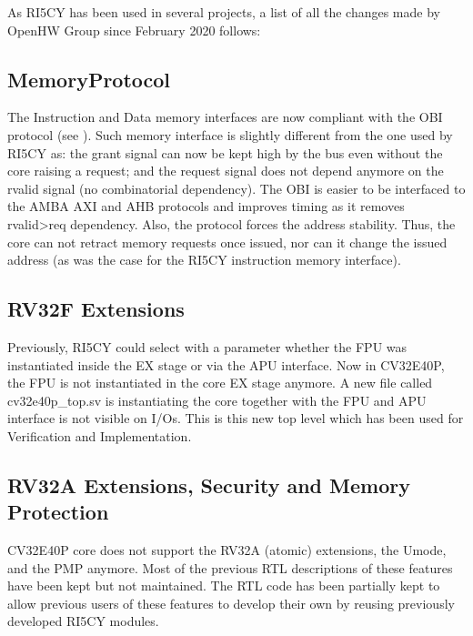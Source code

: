 \documentclass[letterpaper,10pt,english]{sphinxmanual}
\begin{document}
\sphinxAtStartPar
As RI5CY has been used in several projects, a list of all the changes made by OpenHW Group since February 2020 follows:


\subsection{Memory\sphinxhyphen{}Protocol}
\label{\detokenize{intro:memory-protocol}}
\sphinxAtStartPar
The Instruction and Data memory interfaces are now compliant with the OBI protocol (see ).
Such memory interface is slightly different from the one used by RI5CY as: the grant signal can now be kept high by the bus even without the core raising a request; and the request signal does not depend anymore on the rvalid signal (no combinatorial dependency). The OBI is easier to be interfaced to the AMBA AXI and AHB protocols and improves timing as it removes rvalid\sphinxhyphen{}\textgreater{}req dependency. Also, the protocol forces the address stability. Thus, the core can not retract memory requests once issued, nor can it change the issued address (as was the case for the RI5CY instruction memory interface).


\subsection{RV32F Extensions}
\label{\detokenize{intro:rv32f-extensions}}
\sphinxAtStartPar
Previously, RI5CY could select with a parameter whether the FPU was instantiated inside the EX stage or via the APU interface. Now in CV32E40P, the FPU is not instantiated in the core EX stage anymore.
A new file called cv32e40p\_top.sv is instantiating the core together with the FPU and APU interface is not visible on I/Os.
This is this new top level which has been used for Verification and Implementation.


\subsection{RV32A Extensions, Security and Memory Protection}
\label{\detokenize{intro:rv32a-extensions-security-and-memory-protection}}
\sphinxAtStartPar
CV32E40P core does not support the RV32A (atomic) extensions, the U\sphinxhyphen{}mode, and the PMP anymore.
Most of the previous RTL descriptions of these features have been kept but not maintained. The RTL code has been partially kept to allow previous users of these features to develop their own by reusing previously developed RI5CY modules.
\end{document}
